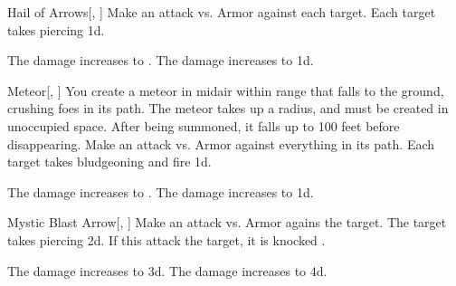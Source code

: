 \lowercase{\hypertarget{spell:Hail of Arrows}{}}\label{spell:Hail of Arrows}
\begin{freeability}[Rank 4]{\hypertarget{spell:Hail of Arrows}{Hail of Arrows}}[, ]
Make an attack vs. Armor against each target.
\hit Each target takes piercing  \minus1d.

\rankline
{} The damage increases to .
 The damage increases to  \plus1d.
\end{freeability}
\vspace{0.25em}



\lowercase{\hypertarget{spell:Meteor}{}}\label{spell:Meteor}
\begin{freeability}[Rank 4]{\hypertarget{spell:Meteor}{Meteor}}[, ]
You create a meteor in midair within \rngclose range that falls to the ground, crushing foes in its path.
The meteor takes up a \areasmall radius, and must be created in unoccupied space.
After being summoned, it falls up to 100 feet before disappearing.
Make an attack vs. Armor against everything in its path.
\hit Each target takes bludgeoning and fire  \minus1d.

\rankline
{} The damage increases to .
 The damage increases to  \plus1d.
\end{freeability}
\vspace{0.25em}



\lowercase{\hypertarget{spell:Mystic Blast Arrow}{}}\label{spell:Mystic Blast Arrow}
\begin{freeability}[Rank 4]{\hypertarget{spell:Mystic Blast Arrow}{Mystic Blast Arrow}}[, ]
Make an attack vs. Armor agains the target.
\hit The target takes piercing  \plus2d.
If this attack  the target, it is knocked .

\rankline
{} The damage increases to  \plus3d.
 The damage increases to  \plus4d.
\end{freeability}
\vspace{0.25em}



